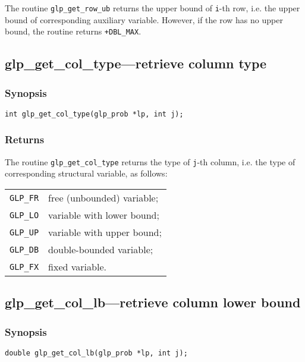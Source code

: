 The routine \verb|glp_get_row_ub| returns the upper bound of
\verb|i|-th row, i.e. the upper bound of corresponding auxiliary
variable. However, if the row has no upper bound, the routine returns
\verb|+DBL_MAX|.

\subsection{glp\_get\_col\_type---retrieve column type}

\subsubsection*{Synopsis}

\begin{verbatim}
int glp_get_col_type(glp_prob *lp, int j);
\end{verbatim}

\subsubsection*{Returns}

The routine \verb|glp_get_col_type| returns the type of \verb|j|-th
column, i.e. the type of corresponding structural variable, as follows:

\begin{tabular}{@{}ll}
\verb|GLP_FR| & free (unbounded) variable; \\
\verb|GLP_LO| & variable with lower bound; \\
\verb|GLP_UP| & variable with upper bound; \\
\verb|GLP_DB| & double-bounded variable; \\
\verb|GLP_FX| & fixed variable. \\
\end{tabular}

\subsection{glp\_get\_col\_lb---retrieve column lower bound}

\subsubsection*{Synopsis}

\begin{verbatim}
double glp_get_col_lb(glp_prob *lp, int j);
\end{verbatim}

